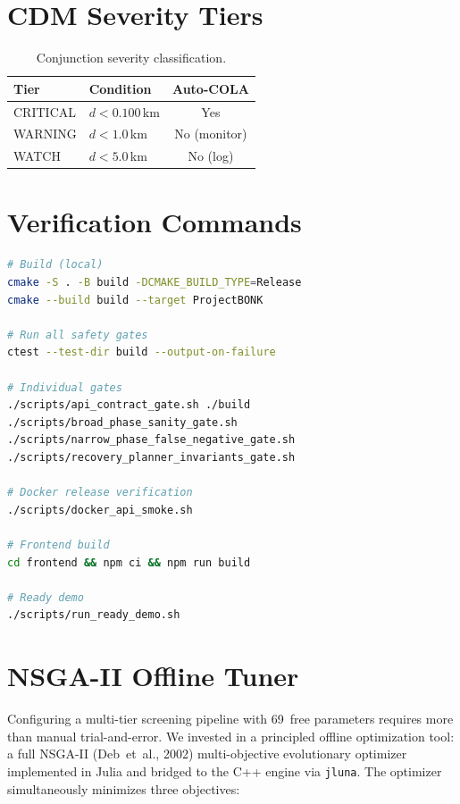 \documentclass[10pt,twocolumn,letterpaper]{article}
\begin{document}
\section{CDM Severity Tiers}\label{app:cdm}

\begin{table}[h]
\centering\small
\begin{tabular}{@{}llc@{}}
\toprule
\textbf{Tier} & \textbf{Condition} & \textbf{Auto-COLA} \\
\midrule
CRITICAL & $d < 0.100$\,km  & Yes \\
WARNING  & $d < 1.0$\,km    & No (monitor) \\
WATCH    & $d < 5.0$\,km    & No (log)     \\
\bottomrule
\end{tabular}
\caption{Conjunction severity classification.}
\label{tab:cdm}
\end{table}

\section{Verification Commands}\label{app:cmds}

\begin{lstlisting}[language=bash]
# Build (local)
cmake -S . -B build -DCMAKE_BUILD_TYPE=Release
cmake --build build --target ProjectBONK

# Run all safety gates
ctest --test-dir build --output-on-failure

# Individual gates
./scripts/api_contract_gate.sh ./build
./scripts/broad_phase_sanity_gate.sh
./scripts/narrow_phase_false_negative_gate.sh
./scripts/recovery_planner_invariants_gate.sh

# Docker release verification
./scripts/docker_api_smoke.sh

# Frontend build
cd frontend && npm ci && npm run build

# Ready demo
./scripts/run_ready_demo.sh
\end{lstlisting}

\section{NSGA-II Offline Tuner}\label{app:tuner}

Configuring a multi-tier screening pipeline with 69~free parameters requires
more than manual trial-and-error.  We invested in a principled offline
optimization tool: a full NSGA-II (Deb~et~al., 2002) multi-objective
evolutionary optimizer implemented in Julia and bridged to the C++ engine
via \texttt{jluna}.  The optimizer simultaneously minimizes three objectives:
\end{document}
